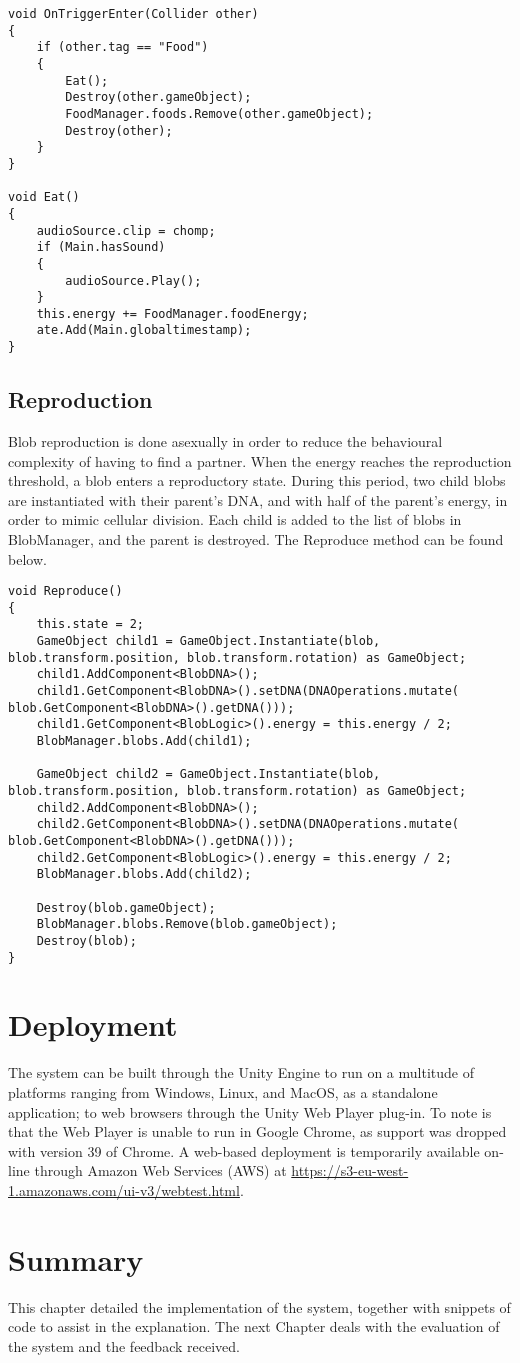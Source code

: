 \begin{lstlisting}
void OnTriggerEnter(Collider other)
{
    if (other.tag == "Food")
    {
        Eat();
        Destroy(other.gameObject);
        FoodManager.foods.Remove(other.gameObject);
        Destroy(other);
    }
}

void Eat()
{
    audioSource.clip = chomp;
    if (Main.hasSound)
    {
        audioSource.Play();
    }
    this.energy += FoodManager.foodEnergy;
    ate.Add(Main.globaltimestamp);
}
\end{lstlisting}

\subsection{Reproduction} \label{reprod}
Blob reproduction is done asexually in order to reduce the behavioural complexity of having to find a partner. When the energy reaches the reproduction threshold, a blob enters a reproductory state. During this period, two child blobs are instantiated with their parent's DNA, and with half of the parent's energy, in order to mimic cellular division. Each child is added to the list of blobs in BlobManager, and the parent is destroyed. The Reproduce method can be found below.

\begin{lstlisting}
void Reproduce()
{
    this.state = 2;
    GameObject child1 = GameObject.Instantiate(blob, blob.transform.position, blob.transform.rotation) as GameObject;
    child1.AddComponent<BlobDNA>();
    child1.GetComponent<BlobDNA>().setDNA(DNAOperations.mutate( blob.GetComponent<BlobDNA>().getDNA()));
    child1.GetComponent<BlobLogic>().energy = this.energy / 2;
    BlobManager.blobs.Add(child1);
    	
    GameObject child2 = GameObject.Instantiate(blob, blob.transform.position, blob.transform.rotation) as GameObject;
    child2.AddComponent<BlobDNA>();
    child2.GetComponent<BlobDNA>().setDNA(DNAOperations.mutate( blob.GetComponent<BlobDNA>().getDNA()));
    child2.GetComponent<BlobLogic>().energy = this.energy / 2;
    BlobManager.blobs.Add(child2);
    	
    Destroy(blob.gameObject);
    BlobManager.blobs.Remove(blob.gameObject);
    Destroy(blob);
}
\end{lstlisting}

\section{Deployment}
The system can be built through the Unity Engine to run on a multitude of platforms ranging from Windows, Linux, and MacOS, as a standalone application; to web browsers through the Unity Web Player plug-in. To note is that the Web Player is unable to run in Google Chrome, as support was dropped with version 39 of Chrome. A web-based deployment is temporarily available on-line through Amazon Web Services (AWS) at \url{https://s3-eu-west-1.amazonaws.com/ui-v3/webtest.html}.

\section{Summary}
This chapter detailed the implementation of the system, together with snippets of code to assist in the explanation. The next Chapter deals with the evaluation of the system and the feedback received.